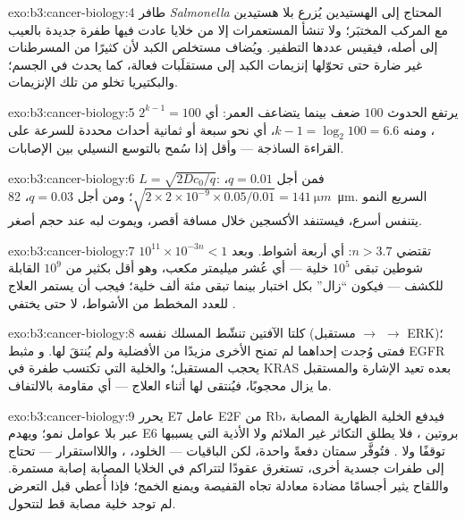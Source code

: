 \begin{solution}{exo:b3:cancer-biology:4}
طافر \emph{Salmonella} المحتاج إلى الهستيدين يُزرع بلا
هستيدين مع المركب المختبَر؛ ولا تنشأ المستعمرات إلا من خلايا
عادت فيها طفرة جديدة بالعيب إلى أصله، فيقيس عددها
التطفير. ويُضاف مستخلص الكبد لأن كثيرًا من المسرطنات
غير ضارة حتى تحوّلها إنزيمات الكبد إلى مستقلَبات فعالة،
كما يحدث في الجسم؛ والبكتيريا تخلو من تلك الإنزيمات.
\end{solution}

\begin{solution}{exo:b3:cancer-biology:5}
يرتفع الحدوث $100$ ضعف بينما يتضاعف العمر: أي $2^{k-1} = 100$، ومنه $k - 1 =
\log_{2}100 = 6.6$، أي نحو سبعة أو ثمانية أحداث محددة للسرعة على
القراءة الساذجة --- وأقل إذا سُمح بالتوسع النسيلي بين الإصابات.
\end{solution}

\begin{solution}{exo:b3:cancer-biology:6}
$L = \sqrt{2Dc_{0}/q}$: فمن أجل $q = 0.01$، $\sqrt{2\times 2\times 10^{-9}
\times 0.05/0.01} = \qty{141}{\micro m}$؛ ومن أجل $q = 0.03$،
\qty{82}{\micro m}.  السريع النمو يتنفس أسرع، فيستنفد
الأكسجين خلال مسافة أقصر، ويموت لبه عند حجم أصغر.
\end{solution}

\begin{solution}{exo:b3:cancer-biology:7}
$10^{11}\times 10^{-3n} < 1$ تقتضي $n > 3.7$: أي أربعة أشواط. وبعد شوطين
تبقى $10^{5}$ خلية --- أي عُشر ميليمتر مكعب، وهو أقل بكثير
من $10^{9}$ القابلة للكشف --- فيكون 
``زال'' بكل اختبار بينما تبقى مئة ألف خلية؛ فيجب أن يستمر
العلاج للعدد المخطط من الأشواط، لا حتى يختفي .
\end{solution}

\begin{solution}{exo:b3:cancer-biology:8}
كلتا الآفتين تنشّط المسلك نفسه (مستقبل $\to$  $\to$ ERK)؛
فمتى وُجدت إحداهما لم تمنح الأخرى مزيدًا من الأفضلية ولم يُنتقَ لها. و
مثبط EGFR يحجب المستقبل؛ والخلية التي تكتسب طفرة في
KRAS بعده تعيد الإشارة والمستقبل ما يزال
محجوبًا، فيُنتقى لها أثناء العلاج --- أي مقاومة بالالتفاف.
\end{solution}

\begin{solution}{exo:b3:cancer-biology:9}
يحرر E7 عامل E2F من Rb، فيدفع الخلية الظهارية المصابة عبر
 بلا عوامل نمو؛ ويهدم E6 بروتين ، فلا يطلق
التكاثر غير الملائم ولا الأذية التي يسببها توقفًا
ولا . فتُوفَّر سمتان دفعةً واحدة، لكن
الباقيات --- الخلود، ، واللااستقرار --- تحتاج إلى طفرات
جسدية أخرى، تستغرق عقودًا لتتراكم في الخلايا المصابة
إصابة مستمرة. واللقاح يثير أجسامًا مضادة معادلة تجاه
القفيصة ويمنع الخمج؛ فإذا أُعطي قبل التعرض لم توجد
خلية مصابة قط لتتحول.
\end{solution}

